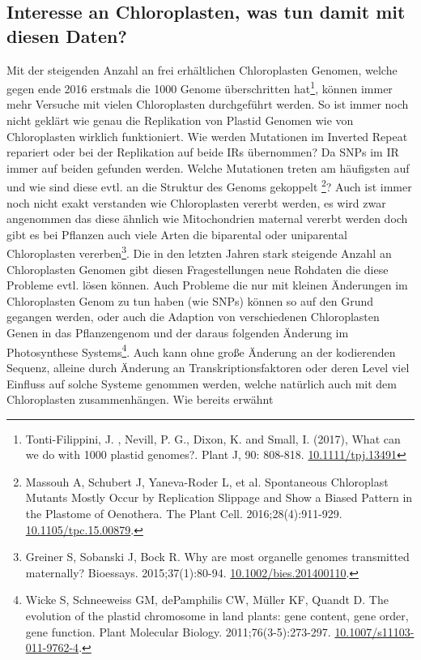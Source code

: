 \documentclass{scrartcl}
\begin{document}
\subsection{Interesse an Chloroplasten, was tun damit mit diesen Daten?}
\label{sec-2-6}
Mit der steigenden Anzahl an frei erhältlichen Chloroplasten Genomen, welche gegen ende 2016 erstmals die 1000 Genome überschritten hat\footnote{Tonti-Filippini, J. , Nevill, P. G., Dixon, K. and Small, I. (2017), What can we do with 1000 plastid genomes?. Plant J, 90: 808-818. \url{10.1111/tpj.13491}}, können immer mehr Versuche mit vielen Chloroplasten durchgeführt werden.
So ist immer noch nicht geklärt wie genau die Replikation von Plastid Genomen wie von Chloroplasten wirklich funktioniert. Wie werden Mutationen im Inverted Repeat repariert oder bei der Replikation auf beide IRs übernommen?
Da SNPs im IR immer auf beiden gefunden werden. Welche Mutationen treten am häufigsten auf und wie sind diese evtl. an die Struktur des Genoms gekoppelt \footnote{Massouh A, Schubert J, Yaneva-Roder L, et al. Spontaneous Chloroplast Mutants Mostly Occur by Replication Slippage and Show a Biased Pattern in the Plastome of Oenothera. The Plant Cell. 2016;28(4):911-929. \url{10.1105/tpc.15.00879}.}? Auch ist immer noch nicht exakt verstanden wie Chloroplasten
vererbt werden, es wird zwar angenommen das diese ähnlich wie Mitochondrien maternal vererbt werden doch gibt es bei Pflanzen auch viele Arten die biparental oder uniparental Chloroplasten vererben\footnote{Greiner S, Sobanski J, Bock R. Why are most organelle genomes transmitted maternally? Bioessays. 2015;37(1):80-94. \url{10.1002/bies.201400110}.}. Die in den letzten 
Jahren stark steigende Anzahl an Chloroplasten Genomen gibt diesen Fragestellungen neue Rohdaten die diese Probleme evtl. lösen können. Auch Probleme die nur mit kleinen Änderungen im Chloroplasten Genom zu tun haben (wie SNPs)
können so auf den Grund gegangen werden, oder auch die Adaption von verschiedenen Chloroplasten Genen in das Pflanzengenom und der daraus folgenden Änderung im Photosynthese Systems\footnote{Wicke S, Schneeweiss GM, dePamphilis CW, Müller KF, Quandt D. The evolution of the plastid chromosome in land plants: gene content, gene order, gene function. Plant Molecular Biology. 2011;76(3-5):273-297. \url{10.1007/s11103-011-9762-4}.}. Auch kann ohne große Änderung an der
kodierenden Sequenz, alleine durch Änderung an Transkriptionsfaktoren oder deren Level viel Einfluss auf solche Systeme genommen werden, welche natürlich auch mit dem Chloroplasten zusammenhängen. Wie bereits erwähnt 
\end{document}
